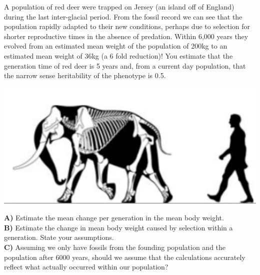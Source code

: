 

\begin{question} \label{question:red_deer}
A population of red deer were trapped on Jersey (an island off of
England) during the last inter-glacial period. From the fossil record \cite{lister:89}
we can see that the population rapidly adapted to their new
conditions, perhaps due to selection for shorter reproductive times in
the absence of predation. Within 6,000 years they evolved from an estimated mean weight of
the population of 200kg to an estimated mean weight of 36kg (a 6 fold
reduction)! You estimate that the generation time
of red deer is 5 years and, from a current day population, that the narrow sense heritability of the
phenotype is 0.5.\\

 \begin{marginfigure}
 \begin{center}
 \includegraphics[width=\textwidth]{illustration_images/Quant_gen/dwarf_elephant/M_exilis_skeletal.pdf} \end{center}
 \caption{It's not just deer that evolve to be small on islands,
  pygmy mammoths and elephants have evolved from large mainland species
  on numerous islands. For example, the
   California Channel Islands were home to a dwarf mammoth until about 13,000 years
   ago. \newline \noindent \tiny{Santa
   Rosa {\it Mammuthus exilis}. \href{https://en.wikipedia.org/wiki/Pygmy_mammoth\#/media/File:M._exilis_skeletal.png}{wikimedia}, CC BY 3.0.} }\label{Fig:Pygmy_mammoth}
 \end{marginfigure}
{\bf A)}	Estimate the mean change per generation in the mean body weight. \\

{\bf B)}	Estimate the change in mean body weight caused by
selection within a generation. State your assumptions.\\

{\bf C)}	Assuming we only have fossils from the founding population and the population after 6000 years, should we assume that the calculations accurately reflect what actually occurred within our population?
\end{question}



